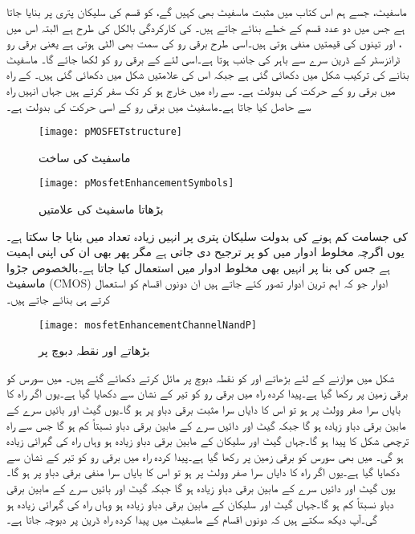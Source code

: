  ماسفیٹ، جسے ہم اس کتاب میں مثبت ماسفیٹ بھی کہیں گے، کو  قسم کی سلیکان پتری پر بنایا جاتا ہے جس میں دو عدد  قسم کے خطے بنائے جاتے ہیں۔ کی کارکردگی بالکل  کی طرح ہے البتہ اس میں ،  اور  تینوں کی قیمتیں منفی ہوتی ہیں۔اسی طرح برقی رو  کی سمت بھی الٹی ہوتی ہے یعنی برقی رو ٹرانزسٹر کے ڈرین سرے سے باہر کی جانب ہوتا ہے۔اسی لئے  کے برقی رو کو  لکھا جائے گا۔ ماسفیٹ بنانے کی ترکیب شکل  میں دکھائی گئی ہے جبکہ اس کی علامتیں شکل  میں دکھائی گئی ہیں۔ کے راہ میں برقی رو  کے حرکت کی بدولت ہے۔ سے  راہ میں خارج ہو کر  تک سفر کرتے ہیں جہاں انہیں راہ سے حاصل کیا جاتا ہے۔ماسفیٹ میں برقی رو  کے اسی حرکت کی بدولت ہے۔ 
\begin{figure}
\centering
\texttt{[image: pMOSFETstructure]}
\caption{ ماسفیٹ کی ساخت}
\label{شکل_ماسفیٹ_مثبت_ساخت}
\end{figure}
%
\begin{figure}
\centering
\texttt{[image: pMosfetEnhancementSymbols]}
\caption{ بڑھاتا ماسفیٹ کی علامتیں}
\label{شکل_ماسفیٹ_مثبت_بڑھاتا_علامتیں}
\end{figure}


  کی جسامت کم ہونے کی بدولت سلیکان پتری پر انہیں زیادہ تعداد میں بنایا جا سکتا ہے۔یوں اگرچہ مخلوط ادوار میں   کو  پر ترجیح دی جاتی ہے مگر پھر بھی ان کی اپنی اہمیت ہے جس کی بنا پر انہیں بھی مخلوط ادوار میں استعمال کیا جاتا ہے۔بالخصوص جڑوا ماسفیٹ  (CMOS) ادوار جو کہ اہم ترین ادوار تصور کئے جاتے ہیں ان دونوں اقسام کو استعمال کرتے ہی بنائے جاتے ہیں۔
\begin{figure}
\centering
\texttt{[image: mosfetEnhancementChannelNandP]}
\caption{بڑھاتے  اور   نقطہ دبوچ پر}
\label{شکل_ماسفیٹ_منفی_اور_مثبت_راہ}
\end{figure}

شکل  میں موازنے کے لئے بڑھاتے  اور  کو نقطہ دبوچ پر مائل کرتے دکھائے گئے ہیں۔ میں سورس  کو برقی زمین پر رکھا گیا ہے۔پیدا کردہ راہ میں برقی رو کو تیر کے نشان سے دکھایا گیا ہے۔یوں اگر راہ کا بایاں سرا صفر وولٹ پر  ہو تو اس کا دایاں سرا مثبت برقی دباو پر ہو گا۔یوں گیٹ اور بائیں سرے کے مابین برقی دباو زیادہ ہو گا جبکہ گیٹ اور دائیں سرے کے مابین برقی دباو نسبتاً کم ہو گا جس سے راہ ترچھی شکل کا پیدا ہو گا۔جہاں گیٹ اور سلیکان کے مابین برقی دباو زیادہ ہو وہاں راہ کی گہرائی زیادہ ہو گی۔ میں بھی سورس  کو برقی زمین پر رکھا گیا ہے۔پیدا کردہ راہ میں برقی رو کو تیر کے نشان سے دکھایا گیا ہے۔یوں اگر راہ کا دایاں سرا صفر وولٹ پر  ہو تو اس کا بایاں سرا منفی برقی دباو پر ہو گا۔یوں گیٹ اور دائیں سرے کے مابین برقی دباو زیادہ ہو گا جبکہ گیٹ اور بائیں سرے کے مابین برقی دباو نسبتاً کم ہو گا۔جہاں گیٹ اور سلیکان کے مابین برقی دباو زیادہ ہو وہاں راہ کی گہرائی زیادہ ہو گی۔آپ دیکھ سکتے ہیں کہ دونوں اقسام کے ماسفیٹ میں پیدا کردہ راہ ڈرین پر دبوچہ جاتا ہے۔

